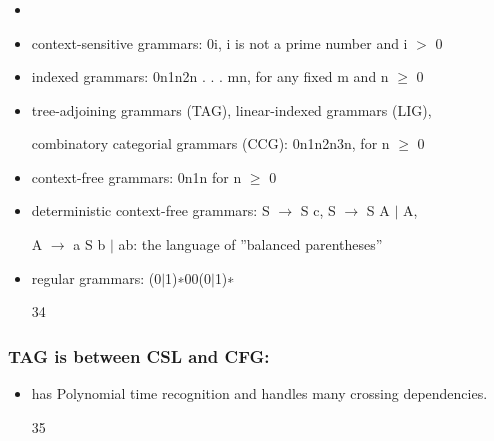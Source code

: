 \documentclass[compress,color=usenames]{beamer}
\begin{document}
\begin{frame}
\frametitle{}

\begin{itemize}
\item

\item context-sensitive grammars: 0i, i is not a prime number and i $>$ 0


\item indexed grammars: 0n1n2n . . . mn, for any ﬁxed m and n $\geq$ 0


\item tree-adjoining grammars (TAG), linear-indexed grammars (LIG),


combinatory categorial grammars (CCG): 0n1n2n3n, for n $\geq$ 0


\item context-free grammars: 0n1n for n $\geq$ 0


\item deterministic context-free grammars: S $\rightarrow$ S c, S $\rightarrow$ S A $\mid$ A,


A $\rightarrow$ a S b $\mid$ ab: the language of ''balanced parentheses''


\item regular grammars: (0$\mid$1)∗00(0$\mid$1)∗


34




\end{itemize}

\end{frame}

\begin{frame}
\frametitle{TAG is between CSL and CFG:}

\begin{itemize}
\item

has Polynomial time recognition and handles many crossing dependencies.


35




\end{itemize}

\end{frame}
\end{document}
